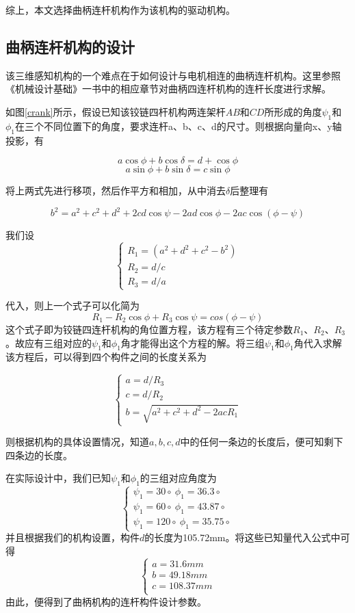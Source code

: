 综上，本文选择曲柄连杆机构作为该机构的驱动机构。

\subsection{曲柄连杆机构的设计}
该三维感知机构的一个难点在于如何设计与电机相连的曲柄连杆机构。这里参照《机械设计基础》一书中的相应章节对曲柄四连杆机构的连杆长度进行求解。

如图\ref{crank}所示，假设已知该铰链四杆机构两连架杆$AB$和$CD$所形成的角度$\psi_1$和$\phi_1$在三个不同位置下的角度，要求连杆a、b、c、d的尺寸。则根据向量向x、y轴投影，有

$$a\cos\phi + b\cos\delta = d + \cos\phi$$
$$a\sin\phi + b\sin\delta = c\sin\phi$$

将上两式先进行移项，然后作平方和相加，从中消去$\delta$后整理有

$$b^2 = a^2 + c^2 + d^2 + 2cd\cos\psi -2ad\cos\phi -2ac\cos(\phi - \psi)$$

我们设
$$ 
\begin{cases}
R_1=(a^2 + d^2 + c^2 - b^2) \\
R_2=d/c \\
R_3=d/a
\end{cases}
$$

代入，则上一个式子可以化简为
$$ R_1-R_2\cos\phi + R_3\cos\psi=cos(\phi-\psi)$$
这个式子即为铰链四连杆机构的角位置方程，该方程有三个待定参数$R_1$、$R_2$、$R_3$。故应有三组对应的$\psi_1$和$\phi_1$角才能得出这个方程的解。将三组$\psi_1$和$\phi_1$角代入求解该方程后，可以得到四个构件之间的长度关系为

$$ 
\begin{cases}
a = d / R_3 \\
c = d / R_2 \\
b = \sqrt{a^2 + c^2 + d^2 -2acR_1}
\end{cases}
$$

则根据机构的具体设置情况，知道$a,b,c,d$中的任何一条边的长度后，便可知剩下四条边的长度。

在实际设计中，我们已知$\psi_1$和$\phi_1$的三组对应角度为
$$ 
\begin{cases}
\psi_1=30\circ \ \phi_1=36.3\circ\\
\psi_1=60\circ \ \phi_1=43.87\circ\\
\psi_1=120\circ \  \phi_1=35.75\circ
\end{cases}
$$
并且根据我们的机构设置，构件$d$的长度为105.72mm。将这些已知量代入公式中可得
$$ 
\begin{cases}
a=31.6mm \\
b=49.18mm \\
c=108.37mm \\
\end{cases}
$$
由此，便得到了曲柄机构的连杆构件设计参数。

